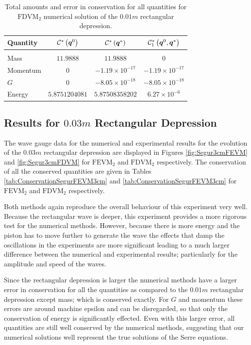\begin{table}
	\centering
	\begin{tabular}{l  c  c c}
		Quantity& $\mathcal{C}^*\left(\boldsymbol{q}^0\right)$ & $\mathcal{C}^*\left(\boldsymbol{q}^*\right)$ & $\mathcal{C}^*_1\left(\boldsymbol{q}^0,\boldsymbol{q}^*\right)$ \\
		\hline &&& \\
		Mass & $11.9888$ & $11.9888$ & $0$\\
		Momentum & $0$ & $-1.19 \times 10^{-17}$ & $-1.19 \times 10^{-17}$\\
		$G$ & $0$ & $-8.05\times 10^{-18}$ & $-8.05\times 10^{-18}$\\
		Energy & $5.8751204081$ & $5.87508358202$ & $6.27 \times 10^{-6}$ \\
	\end{tabular}
	\caption{Total amounts and error in conservation for all quantities for $\text{FDVM}_2$ numerical solution of the $0.01m$ rectangular depression.}
	\label{tab:ConservationSegurFDVM1cm}
\end{table}  
 

\subsection{Results for $0.03m$ Rectangular Depression}

The wave gauge data for the numerical and experimental results for the evolution of the $0.03m$ rectangular depression are displayed in Figures \ref{fig:Segur3cmFEVM} and \ref{fig:Segur3cmFDVM} for $\text{FEVM}_2$ and $\text{FDVM}_2$ respectively. The conservation of all the conserved quantities are given in Tables \ref{tab:ConservationSegurFEVM3cm} and \ref{tab:ConservationSegurFEVM3cm} for $\text{FEVM}_2$ and $\text{FDVM}_2$ respectively.

Both methods again reproduce the overall behaviour of this experiment very well. Because the rectangular wave is deeper, this experiment provides a more rigorous test for the numerical methods. However, because there is more energy and the piston has to move further to generate the wave the effects that damp the oscillations in the experiments are more significant leading to a much larger difference between the numerical and experimental results; particularly for the amplitude and speed of the waves.

Since the rectangular depression is larger the numerical methods have a larger error in conservation for all the quantities as compared to the $0.01m$ rectangular depression except mass; which is conserved exactly. For $G$ and momentum these errors are around machine epsilon and can be disregarded, so that only the conservation of energy is significantly effected. Even with this larger error, all quantities are still well conserved by the numerical methods, suggesting that our numerical solutions well represent the true solutions of the Serre equations. 

